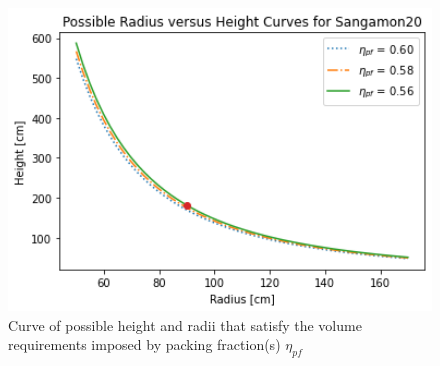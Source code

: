 \begin{figure}[H]
\centering
\includegraphics[width = 12cm]{figures/act-core-RH.png}
\caption{Curve of possible height and radii that satisfy the volume requirements imposed by packing fraction(s) $\eta_{pf}$}
\label{fig:rh-vol}
\end{figure}